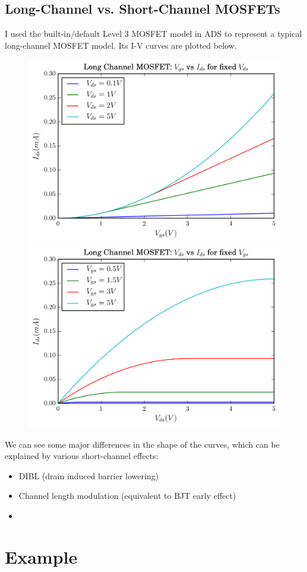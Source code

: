 \documentclass[11pt]{article}
\begin{document}
\subsection{Long-Channel vs. Short-Channel MOSFETs}
I used the built-in/default Level 3 MOSFET model in ADS to represent a typical long-channel MOSFET model. Its I-V curves are plotted below.
\begin{figure}[H]
	\includegraphics[width=\linewidth]{images/long_channel_vgs_vs_ids.png}
	\endminipage\hfill
	\includegraphics[width=\linewidth]{images/long_channel_vds_vs_ids.png}
	\endminipage
\end{figure}

We can see some major differences in the shape of the curves, which can be explained by various short-channel effects:

\begin{itemize}
	\item DIBL (drain induced barrier lowering)
	\item Channel length modulation (equivalent to BJT early effect)
	\item 
\end{itemize}

\newpage
\appendix
\section{Example} \label{ex}
\end{document}
